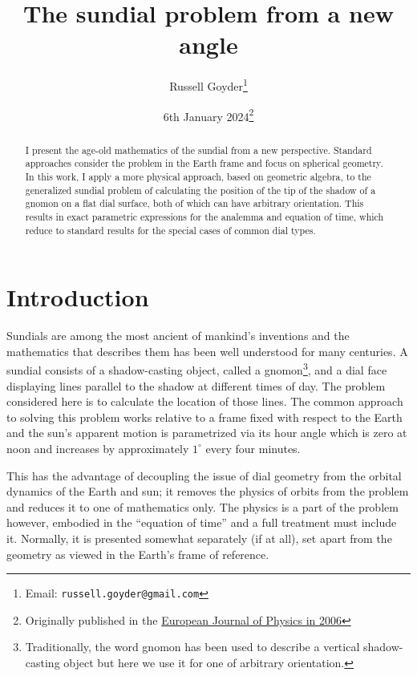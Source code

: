 \documentclass[12pt]{article}
\begin{document}
\title{The sundial problem from a new angle}
\author{Russell Goyder\footnote{Email: \texttt{russell.goyder@gmail.com}}}
\date{6th January 2024\footnote{Originally published in the \href{https://iopscience.iop.org/article/10.1088/0143-0807/27/2/023}{European Journal of Physics in 2006}}}
\maketitle

\begin{abstract}
  I present the age-old mathematics of the sundial from a new perspective. Standard approaches consider the problem in the Earth frame and focus on spherical geometry. In this work, I apply a more physical approach, based on geometric algebra, to the generalized sundial problem of calculating the position of the tip of the shadow of a gnomon on a flat dial surface, both of which can have arbitrary orientation. This results in exact parametric expressions for the analemma and equation of time, which reduce to standard results for the special cases of common dial types.
\end{abstract}

\section{Introduction}
%
Sundials are among the most ancient of mankind's inventions and the mathematics that describes them has been well understood for many centuries. A sundial consists of a shadow-casting object, called a gnomon\footnote{Traditionally, the word gnomon has been used to describe a vertical shadow-casting object but here we use it for one of arbitrary orientation.}, and a dial face displaying lines parallel to the shadow at different times of day. The problem considered here is to calculate the location of those lines. The common approach to solving this problem works relative to a frame fixed with respect to the Earth and the sun's apparent motion is parametrized via its hour angle which is zero at noon and increases by approximately $1^\circ$ every four minutes.

This has the advantage of decoupling the issue of dial geometry from the orbital dynamics of the Earth and sun; it removes the physics of orbits from the problem and reduces it to one of mathematics only. The physics is a part of the problem however, embodied in the ``equation of time'' and a full treatment must include it. Normally, it is presented somewhat separately (if at all), set apart from the geometry as viewed in the Earth's frame of reference.
\end{document}
